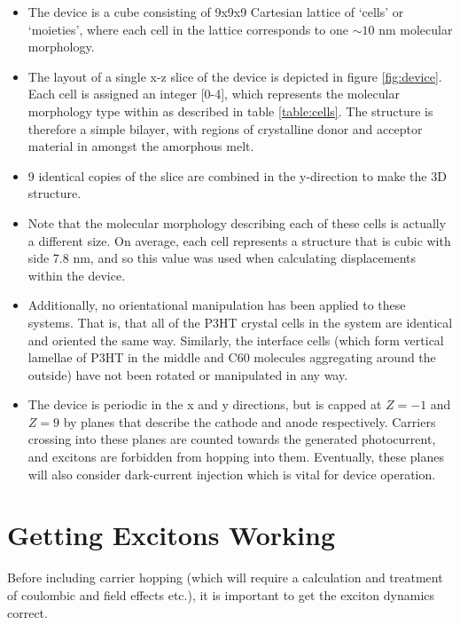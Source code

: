 \documentclass[12pt]{article}
\begin{document}
\begin{itemize}
    \item{The device is a cube consisting of 9x9x9 Cartesian lattice of `cells' or `moieties', where each cell in the lattice corresponds to one $\sim 10$ nm molecular morphology.}
    \item{The layout of a single x-z slice of the device is depicted in figure \ref{fig:device}. Each cell is assigned an integer [0-4], which represents the molecular morphology type within as described in table \ref{table:cells}. The structure is therefore a simple bilayer, with regions of crystalline donor and acceptor material in amongst the amorphous melt.}
    \item{9 identical copies of the slice are combined in the y-direction to make the 3D structure.}
    \item{Note that the molecular morphology describing each of these cells is actually a different size. On average, each cell represents a structure that is cubic with side 7.8 nm, and so this value was used when calculating displacements within the device.}
    \item{Additionally, no orientational manipulation has been applied to these systems. That is, that all of the P3HT crystal cells in the system are identical and oriented the same way. Similarly, the interface cells (which form vertical lamellae of P3HT in the middle and C60 molecules aggregating around the outside) have not been rotated or manipulated in any way.}
    \item{The device is periodic in the x and y directions, but is capped at $Z = -1$ and $Z = 9$ by planes that describe the cathode and anode respectively. Carriers crossing into these planes are counted towards the generated photocurrent, and excitons are forbidden from hopping into them. Eventually, these planes will also consider dark-current injection which is vital for device operation.} 
\end{itemize}

\clearpage

\section{Getting Excitons Working}

Before including carrier hopping (which will require a calculation and treatment of coulombic and field effects etc.), it is important to get the exciton dynamics correct.
\end{document}
